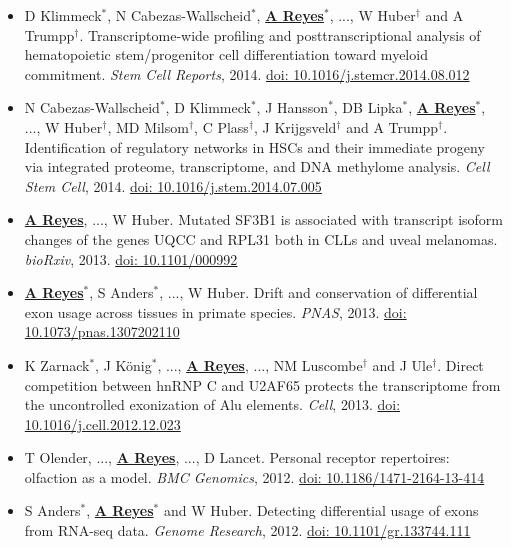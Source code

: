 \documentclass[11pt,a4paper,sans]{moderncv} %
\begin{document}
\begin{itemize}
\item D Klimmeck$^{\ast}$, N Cabezas-Wallscheid$^{\ast}$, \textbf{\underline{A Reyes}}$^{\ast}$, ..., W Huber$^{\dagger}$ and A Trumpp$^{\dagger}$. Transcriptome-wide profiling and posttranscriptional analysis of hematopoietic stem/progenitor cell differentiation toward myeloid commitment. \textit{Stem Cell Reports}, 2014. \href{https://doi.org/10.1016/j.stemcr.2014.08.012}{doi: 10.1016/j.stemcr.2014.08.012}
\item N Cabezas-Wallscheid$^{\ast}$, D Klimmeck$^{\ast}$, J Hansson$^{\ast}$, DB Lipka$^{\ast}$, \textbf{\underline{A Reyes}}$^{\ast}$, ..., W Huber$^{\dagger}$, MD Milsom$^{\dagger}$, C Plass$^{\dagger}$, J Krijgsveld$^{\dagger}$ and A Trumpp$^{\dagger}$. Identification of regulatory networks in HSCs and their immediate progeny via integrated proteome, transcriptome, and DNA methylome analysis. \textit{Cell Stem Cell}, 2014. \href{https://doi.org/10.1016/j.stem.2014.07.005}{doi: 10.1016/j.stem.2014.07.005}
\item \textbf{\underline{A Reyes}}, ..., W Huber. Mutated SF3B1 is associated with transcript isoform changes of the genes UQCC and RPL31 both in CLLs and uveal melanomas. \textit{bioRxiv}, 2013. \href{https://doi.org/10.1101/000992}{doi: 10.1101/000992}
\item \textbf{\underline{A Reyes}}$^{\ast}$, S Anders$^{\ast}$, ..., W Huber. Drift and conservation of differential exon usage across tissues in primate species. \textit{PNAS}, 2013. \href{https://doi.org/10.1073/pnas.1307202110}{doi: 10.1073/pnas.1307202110}
\item K Zarnack$^{\ast}$, J K\"{o}nig$^{\ast}$, ..., \textbf{\underline{A Reyes}}, ..., NM Luscombe$^{\dagger}$ and J Ule$^{\dagger}$. Direct competition between hnRNP C and U2AF65 protects the transcriptome from the uncontrolled exonization of Alu elements. \textit{Cell}, 2013. \href{https://doi.org/10.1016/j.cell.2012.12.023}{doi: 10.1016/j.cell.2012.12.023}
\item T Olender, ..., \textbf{\underline{A Reyes}}, ..., D Lancet. Personal receptor repertoires: olfaction as a model. \textit{BMC Genomics}, 2012. \href{https://doi.org/10.1186/1471-2164-13-414}{doi: 10.1186/1471-2164-13-414}
\item S Anders$^{\ast}$, \textbf{\underline{A Reyes}}$^{\ast}$ and W Huber. Detecting differential usage of exons from RNA-seq data. \textit{Genome Research}, 2012. \href{https://doi.org/10.1101/gr.133744.111}{doi: 10.1101/gr.133744.111}
\end{itemize}
\vspace{-.13cm}
\end{document}
